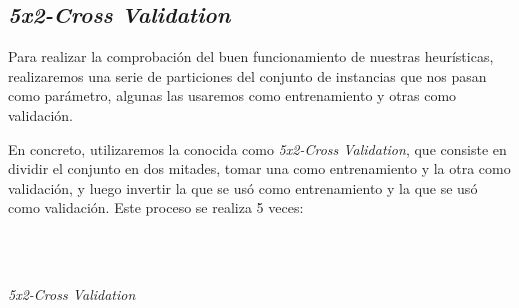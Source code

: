 	\subsection{\textit{5x2-Cross Validation}}
		Para realizar la comprobación del buen funcionamiento de nuestras heurísticas, realizaremos
		una serie de particiones del conjunto de instancias que nos pasan como parámetro, algunas
		las usaremos como entrenamiento y otras como validación.
		
		En concreto, utilizaremos la conocida como \textit{5x2-Cross Validation}, que consiste en
		dividir el conjunto en dos mitades, tomar una como entrenamiento y la otra como validación,
		y luego invertir la que se usó como entrenamiento y la que se usó como validación. Este
		proceso se realiza 5 veces:
		
		\begin{algorithm}[H]
			\begin{algorithmic}[1]
				\REQUIRE \ \\
					 \
					 

									  		
				\ENDFOR
				
			\end{algorithmic}
		\caption{\textit{5x2-Cross Validation}}
		\label{Cross-Validation}
		\end{algorithm}			
		
